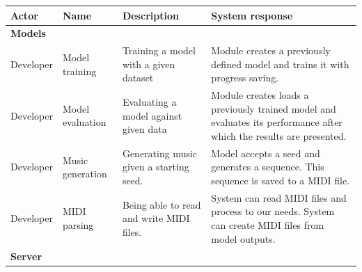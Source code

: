 \documentclass{article}
\begin{document}
\begin{center}
    \begin{tabular}{ |p{}|p{}|p{}|p{}| }
        \hline
        Actor     & Name                & Description                                 & System response                                                                                                                                                                                                   \\
        \hline
        \multicolumn{4}{|l|}{\textbf{Models}}                                                                                                                                                                                                                                                             \\
        \hline
        Developer & Model training      & Training a model with a given dataset       & Module creates a previously defined model and trains it with progress saving.                                                                                                                                     \\
        \hline
        Developer & Model evaluation    & Evaluating a model against given data       & Module creates loads a previously trained model and evaluates its performance after which the results are presented.                                                                                              \\
        \hline
        Developer & Music generation    & Generating music given a starting seed.     & Model accepts a seed and generates a sequence. This sequence is saved to a MIDI file.                                                                                                                             \\
        \hline
        Developer & MIDI parsing        & Being able to read and write MIDI files.    & System can read MIDI files and process to our needs. System can create MIDI files from model outputs.                                                                                                             \\
        \hline
        \multicolumn{4}{|l|}{\textbf{Server}}                                                                                                                                                                                                                                                             \\

\end{tabular}
\end{center}
\end{document}

